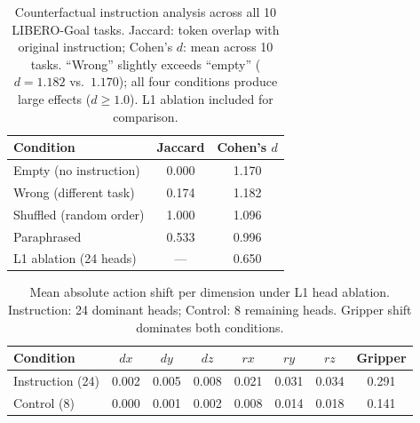\begin{table}[h]
\centering
\caption{Counterfactual instruction analysis across all 10 LIBERO-Goal tasks. Jaccard: token overlap with original instruction; Cohen's $d$: mean across 10 tasks. ``Wrong'' slightly exceeds ``empty'' ($d = 1.182$ vs.\ $1.170$); all four conditions produce large effects ($d \geq 1.0$). L1 ablation included for comparison.}
\label{tab:counterfactual_goal}
\small
\begin{tabular}{lcc}
\toprule
\textbf{Condition} & \textbf{Jaccard} & \textbf{Cohen's $d$} \\
\midrule
Empty (no instruction) & 0.000 & 1.170 \\
Wrong (different task) & 0.174 & 1.182 \\
Shuffled (random order) & 1.000 & 1.096 \\
Paraphrased & 0.533 & 0.996 \\
\midrule
L1 ablation (24 heads) & --- & 0.650 \\
\bottomrule
\end{tabular}
\end{table}

\begin{table}[h]
\centering
\caption{Mean absolute action shift per dimension under L1 head ablation. Instruction: 24 dominant heads; Control: 8 remaining heads. Gripper shift dominates both conditions.}
\label{tab:action_shift_perdim}
\small
\begin{tabular}{lccccccc}
\toprule
\textbf{Condition} & \textbf{$dx$} & \textbf{$dy$} & \textbf{$dz$} & \textbf{$rx$} & \textbf{$ry$} & \textbf{$rz$} & \textbf{Gripper} \\
\midrule
Instruction (24) & 0.002 & 0.005 & 0.008 & 0.021 & 0.031 & 0.034 & 0.291 \\
Control (8) & 0.000 & 0.001 & 0.002 & 0.008 & 0.014 & 0.018 & 0.141 \\
\bottomrule
\end{tabular}
\end{table}

